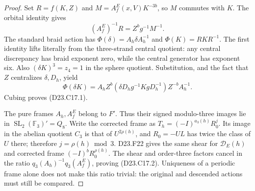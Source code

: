\begin{proof}
Set $R=f(K,Z)$ and $M=A^E_f(x,V)K^{-3b}$, so $M$ commutes with
$K$. The orbital identity gives
\[
                 (A^E_f)^{-1}R=Z^b g^{-1}M^{-1}.
\]
The standard braid action has
$\Phi(\delta)=A_h\delta A_h^{-1}$ and
$\Phi(K)=RKR^{-1}$. The first identity lifts literally from the
three-strand central quotient: any central discrepancy has braid
exponent zero, while the central generator has exponent six.
Also $(\delta K)^3=z_4=1$ in the sphere quotient. Substitution,
and the fact that $Z$ centralizes $\delta,D_h$, yield
\[
 \Phi(\delta K)
   =A_h Z^b(\delta D_h g^{-1}K gD_h^{-1})Z^{-b}A_h^{-1}.
\]
Cubing proves (D23.C17.1).

The pure frames $A_h,A^E_f$ belong to $F'$. Thus their signed
modulo-three images lie in
$\operatorname{SL}_2(\mathbb F_3)'=Q_8$.
Write the corrected frame as $T_h=(-I)^{a_3(h)}R_0^j$.
Its image in the abelian quotient $C_3$ is that of
$U^{2\rho(h)}$, and $R_0=-UL$ has twice the class of $U$ there;
therefore $j=\rho(h)\bmod3$. D23.F22 gives the same shear for
$\mathcal D_E(h)$ and corrected frame
$(-I)^bR_0^{\rho(h)}$. The shear and order-three factors cancel
in the ratio $q_3(A_h)^{-1}q_3(A^E_f)$, proving (D23.C17.2).
Uniqueness of a periodic frame alone does not make this ratio
trivial: the original and descended actions must still be compared.
\end{proof}
